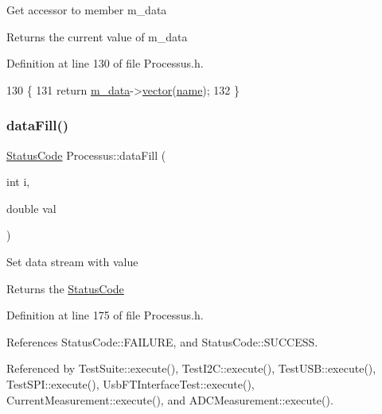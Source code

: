 Get accessor to member m\+\_\+data \begin{DoxyReturn}{Returns}
the current value of m\+\_\+data 
\end{DoxyReturn}


Definition at line 130 of file Processus.\+h.


\begin{DoxyCode}
130                                         \{
131     \textcolor{keywordflow}{return} \hyperlink{classProcessus_a3da9a9de8af54e2f47807a3e09dfccff}{m\_data}->\hyperlink{classData_a94e00cdd58c1d6f11487f1ac47fee4bc}{vector}(\hyperlink{classObject_a300f4c05dd468c7bb8b3c968868443c1}{name});
132   \}
\end{DoxyCode}
\mbox{\label{classProcessus_a0d093b48f3218a088ba030e24372f18c}} 
\subsubsection{\texorpdfstring{data\+Fill()}{dataFill()}\hspace{0.1cm}{\footnotesize\ttfamily [1/2]}}
{\footnotesize\ttfamily \hyperlink{classStatusCode}{Status\+Code} Processus\+::data\+Fill (\begin{DoxyParamCaption}\item[{int}]{i,  }\item[{double}]{val }\end{DoxyParamCaption})\hspace{0.3cm}{\ttfamily [inline]}}

Set data stream with value \begin{DoxyReturn}{Returns}
the \hyperlink{classStatusCode}{Status\+Code} 
\end{DoxyReturn}


Definition at line 175 of file Processus.\+h.



References Status\+Code\+::\+F\+A\+I\+L\+U\+RE, and Status\+Code\+::\+S\+U\+C\+C\+E\+SS.



Referenced by Test\+Suite\+::execute(), Test\+I2\+C\+::execute(), Test\+U\+S\+B\+::execute(), Test\+S\+P\+I\+::execute(), Usb\+F\+T\+Interface\+Test\+::execute(), Current\+Measurement\+::execute(), and A\+D\+C\+Measurement\+::execute().


